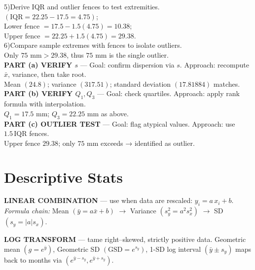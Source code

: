 \documentclass[landscape,0.4pt]{article}
\begin{document}
\begin{multicols*}{6}
5)\;Derive IQR and outlier fences to test extremities.\\
\hspace*{1em}$(\text{IQR}=22.25-17.5=4.75)$;\\
\hspace*{1em}Lower fence $=17.5-1.5(4.75)=10.38$;\\
\hspace*{1em}Upper fence $=22.25+1.5(4.75)=29.38$.\\

6)\;Compare sample extremes with fences to isolate outliers.\\
\hspace*{1em}Only $75\text{ mm}>29.38$, thus $75\text{ mm}$ is the single outlier.\\[-2pt]

\textbf{\tiny{PART (a) VERIFY $s$}} — Goal: confirm dispersion via $s$.  
Approach: recompute $\bar{x}$, variance, then take root.\\
Mean $(24.8)$; variance $(317.51)$; standard deviation $(17.81884)$ matches.\\

\textbf{\tiny{PART (b) VERIFY $Q_{1},Q_{3}$}} — Goal: check quartiles.  
Approach: apply rank formula with interpolation.\\
$Q_{1}=17.5\text{ mm}$; $Q_{3}=22.25\text{ mm}$ as above.\\

\textbf{\tiny{PART (c) OUTLIER TEST}} — Goal: flag atypical values.  
Approach: use $1.5\,\text{IQR}$ fences.\\
Upper fence $29.38$; only $75\text{ mm}$ exceeds → identified as outlier.\\[-2pt]


\section*{\small{Descriptive Stats
}}

\textbf{\tiny{LINEAR COMBINATION}} — use when data are rescaled: $y_i=a\,x_i+b$.  
\textit{Formula chain:} Mean $(\bar{y}=a\bar{x}+b)$ $\rightarrow$ Variance $(s_y^{2}=a^{2}s_x^{2})$ $\rightarrow$ SD $(s_y=|a|s_x)$.  

\textbf{\tiny{LOG TRANSFORM}} — tame right–skewed, strictly positive data.  
Geometric mean $(g=e^{\bar{y}})$, Geometric SD $(\text{GSD}=e^{s_y})$,  
1-SD log interval $(\bar{y}\!\pm\!s_y)$ maps back to months via $(e^{\bar{y}-s_y},e^{\bar{y}+s_y})$.  


\end{multicols*}
\end{document}
